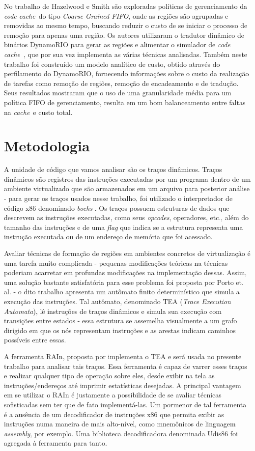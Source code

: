 \documentclass[11pt,twoside]{article}
\newcommand{\ccache}{\emph{code cache}}
\newcommand{\cache}{\emph{cache}}
\newcommand{\coarsefifo}{\emph{Coarse Grained FIFO}}
\begin{document}
No trabalho de Hazelwood e Smith \cite{kim-2004} são exploradas políticas de gerenciamento da \ccache~do tipo \coarsefifo, onde as regiões são agrupadas e removidas ao mesmo tempo, buscando reduzir o custo de se iniciar o processo de remoção para apenas uma região. Os autores utilizaram o tradutor dinâmico de binários DynamoRIO \cite{dynamorio-url} para gerar as regiões e alimentar o simulador de \ccache~, que por sua vez implementa as várias técnicas analisadas. Também neste trabalho foi construído um modelo analítico de custo, obtido através do perfilamento do DynamoRIO, fornecendo informações sobre o custo da realização de tarefas como remoção de regiões, remoção de encadeamento e de tradução. Seus resultados mostraram que o uso de uma granularidade média para um política FIFO de gerenciamento, resulta em um bom balanceamento entre faltas na \cache~e custo total.


\section{Metodologia}
\label{sec-metodologia}
A unidade de código que vamos analisar são os traços dinâmicos. Traços dinâmicos são registros das instruções executadas por um programa dentro de um ambiente virtualizado que são armazenados em um arquivo para posterior análise - para gerar os traços usados nesse trabalho, foi utilizado o interpretador de código x86 denominado \emph{bochs} \cite{bochs-url}. Os traços possuem estruturas de dados que descrevem as instruções executadas, como seus \emph{opcodes}, operadores, etc., além do tamanho das instruções e de uma \emph{flag} que indica se a estrutura representa uma instrução executada ou de um endereço de memória que foi acessado.

Avaliar técnicas de formação de regiões em ambientes concretos de virtualização é uma tarefa muito complicada - pequenas modificações teóricas na técnicas poderiam acarretar em profundas modificações na implementação dessas. Assim, uma solução bastante satisfatória para esse problema foi proposta por Porto et. al. \cite{guido-2012} - o dito trabalho apresenta um autômato finito determinístico que simula a execução das instruções. Tal autômato, denominado TEA (\emph{Trace Execution Automata}), lê instruções de traços dinâmicos e simula sua execução com transições entre estados - essa estrutura se assemelha visualmente a um grafo dirigido em que os nós representam instruções e as arestas indicam caminhos possíveis entre essas.

A ferramenta RAIn, proposta por \cite{thesis-zinsly} implementa o TEA e será usada no presente trabalho para analisar tais traços. Essa ferramenta é capaz de varrer esses traços e realizar qualquer tipo de operação sobre eles, desde exibir na tela as instruções/endereços até imprimir estatísticas desejadas. A principal vantagem em se utilizar o RAIn é justamente a possibilidade de se avaliar técnicas sofisticadas sem ter que de fato implementá-las. Um pormenor de tal ferramenta é a ausência de um decodificador de instruções x86 que permita exibir as instruções numa maneira de mais alto-nível, como mnemônicos de linguagem \emph{assembly}, por exemplo. Uma biblioteca decodificadora denominada Udis86 \cite{udis86-url} foi agregada à ferramenta para tanto.
\end{document}
